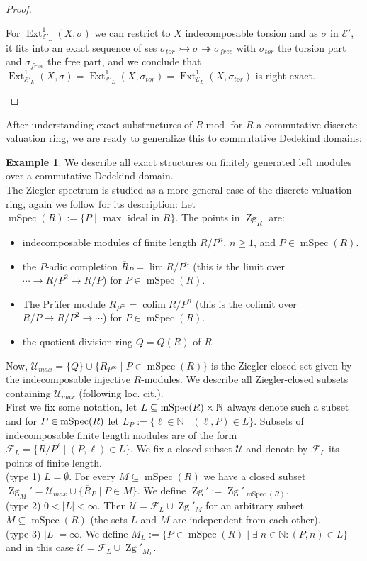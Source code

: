 \documentclass[11pt,a4paper]{amsart}
\theoremstyle{plain}
\theoremstyle{definition}
\newtheorem{exa}[thm]{Example}
\DeclareMathOperator{\Ext}{Ext}
\DeclareMathOperator{\modu}{mod}
\DeclareMathOperator*{\colim}{colim}
\newcommand{\defl}{\twoheadrightarrow}
\newcommand{\infl}{\rightarrowtail}
\newcommand{\mcE}{\mathcal{E}}
\newcommand{\mcF}{\mathcal{F}}
\newcommand{\mcU}{\mathcal{U}}
\DeclareMathOperator{\Zg}{Zg}
\DeclareMathOperator{\mSpec}{mSpec}
\begin{document}
\begin{proof}
\begin{itemize}
For $\Ext^1_{\mcE'_L}(X,\sigma) $ we can restrict to $X$ indecomposable torsion and as $\sigma$ in $\mcE'$, it fits into an exact sequence of ses $\sigma_{tor}\infl \sigma \defl \sigma_{free}$ with $\sigma_{tor}$ the torsion part and $\sigma_{free}$ the free part, and we conclude that $\Ext^1_{\mcE'_L}(X,\sigma)= \Ext^1_{\mcE'_L} (X, \sigma_{tor}) =\Ext^1_{\mcE_L} (X, \sigma_{tor})$ is right exact.   
\end{itemize}
\end{proof}

After understanding exact substructures of $R\modu$ for $R$ a commutative discrete valuation ring, we are ready to generalize this to commutative Dedekind domains:  
\begin{exa}
We describe all exact structures on finitely generated left modules over a commutative Dedekind domain. \\
The Ziegler spectrum is studied as a more general case of the discrete valuation ring, again we follow \cite[Section 5.2]{Pr} for its description: Let $\mSpec (R):=\{P\mid \text{ max. ideal in } R\}$. 
The points in $\Zg_R$ are:
\begin{itemize}
\item[(a)] indecomposable modules of finite length $R/P^n$, $n\geq 1$, and $P\in \mSpec (R)$.
\item[(b)] the $P$-adic completion $\overline{R}_P=\lim R/P^n$ (this is the limit over $\cdots \to R/P^{2} \to R/P$) for $P\in \mSpec (R)$.
\item[(c)] The Pr\"ufer module $R_{P^{\infty}}=\colim R/P^n$ (this is the colimit over $R/P \to R/P^2 \to \cdots $) for $P\in \mSpec (R)$.
\item[(d)] the quotient division ring $Q=Q(R)$ of $R$
\end{itemize}
Now, $\mcU_{max}=\{Q\}\cup  \{R_{P^{\infty}}\mid  P\in \mSpec (R)\}$ is the Ziegler-closed set given by the indecomposable injective $R$-modules. We describe all Ziegler-closed subsets containing $\mcU_{max}$ (following loc. cit.). \\
First we fix some notation, let $L\subseteq {\rm mSpec} (R) \times \mathbb{N}$ always denote such a subset and for $P\in {\rm mSpec} (R)$ let $L_P:=\{\ell \in \mathbb{N}\mid (\ell, P)\in L\}$. 
Subsets of indecomposable finite length modules are of the form $\mcF_L=\{ R/P^{\ell} \mid (P, \ell) \in L\}$.  
We fix a closed subset $\mcU$ and denote by $\mcF_L$ its points of finite length. 
\\
(type 1) $L=\emptyset$. 
For every $M\subseteq \mSpec  (R)$ we have a closed subset $\Zg_M'=\mcU_{max} \cup \{\overline{R}_P \mid P \in M\}$. We define  $\Zg':=\Zg'_{\mSpec (R)}$. \\
(type 2) $0< \lvert L \rvert <\infty$. 
Then $\mcU=\mcF_L \cup \Zg'_M$ for an arbitrary subset $M \subseteq \mSpec (R)$ (the sets $L$ and $M$ are independent from each other).\\
(type 3) $\lvert L \rvert =\infty$. 
We define $M_L:=\{P\in \mSpec (R)\mid \exists \; n \in \mathbb{N} \colon (P,n)\in L \}$ and in this case 
$\mcU=\mcF_L\cup \Zg'_{M_L}$.\\


\end{exa}
\end{document}
